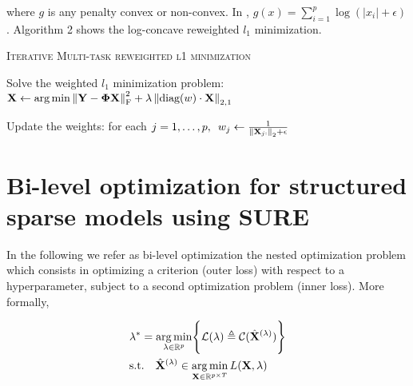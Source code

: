 \documentclass[a4paper,10pt]{article}
\theoremstyle{definition}
\begin{document}
where $g$ is any penalty convex or non-convex. In \cite{Candes_Wakin_Boyd08}, $g(x) = \sum_{i=1}^p \log(\lvert x_i \rvert + \epsilon)$. Algorithm 2 shows the log-concave reweighted $l_1$ minimization.

\vskip 0.2in

{\fontsize{4}{4}\selectfont
\begin{algorithm}[h]  %
\caption{\textsc{Iterative Multi-task reweighted l1 minimization}
}
%

    {
        Solve the weighted $l_1$ minimization problem:
        $\mathbf{X} \leftarrow \operatorname*{arg\,min} \left \lVert \mathbf{Y} -  \mathbf{\Phi} \mathbf{X} \right \rVert_{\text{F}}^2 + \lambda \left \lVert \text{diag}(w) \cdot \mathbf{X} \right \rVert_{2, 1}$

        Update the weights: for each
        $j = 1, \dots, p, \enspace w_j \leftarrow \frac{1}{\left \lVert \mathbf{X}_{j:} \right \rVert_2 + \epsilon}$
    }

\end{algorithm}
}

\newpage

\section{Bi-level optimization for structured sparse models using SURE}
\label{section_6}

In the following we refer as bi-level optimization the nested optimization problem
which consists in optimizing a criterion (outer loss) with respect to a hyperparameter, subject to
a second optimization problem (inner loss). More formally,

\begin{align*}
    &\lambda^* = \operatorname*{arg\,min}_{\lambda \in \mathbb{R}^p} \Biggl\{\mathcal{L}(\lambda) \triangleq \mathcal{C}(\hat{\mathbf{X}}^{(\lambda)})\Biggr\} \\
    &\text{s.t.} \quad \hat{\mathbf{X}}^{(\lambda)} \in \operatorname*{arg\,min}_{\mathbf{X} \in \mathbb{R}^{p\times T}} L(\mathbf{X}, \lambda)
\end{align*}
\end{document}
